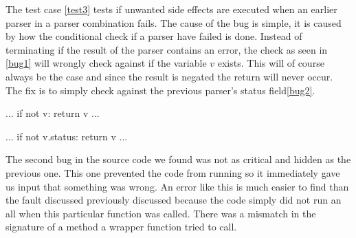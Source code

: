 The test case \ref{test3} tests if unwanted side effects are executed when an earlier parser in a parser combination fails.
The cause of the bug is simple, it is caused by how the conditional check if a parser have failed is done.
Instead of terminating if the result of the parser contains an error, the check as seen in \ref{bug1} will wrongly check against if the variable $v$ exists.
This will of course always be the case and since the result is negated the return will never occur. The fix is to simply check against the previous parser's status field\ref{bug2}.


\renewcommand{\lstlistingname}{Code}

\begin{python}[caption={Fault in the source code.}, label=bug1]
    ...
    if not v:
        return v
    ...
\end{python}


\begin{python}[caption={The fix to the bug showcased in \ref{bug1}.}, label=bug2]
    ...
    if not v.status:
        return v
    ...
\end{python}


The second bug in the source code we found was not as critical and hidden as the previous one. This one prevented the code from running so it immediately gave us input that something was wrong.
An error like this is much easier to find than the fault discussed previously discussed because the code simply did not run an all when this particular function was called.
There was a mismatch in the signature of a method a wrapper function tried to call.





